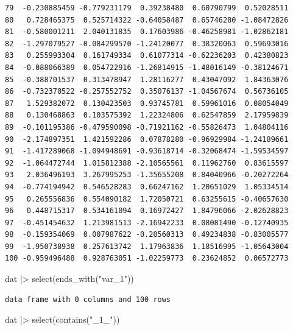 \documentclass[
  letterpaper,
  DIV=11,
  numbers=noendperiod]{scrreprt}
\newenvironment{Shaded}{\begin{snugshade}}{\end{snugshade}}
\newcommand{\FunctionTok}[1]{\textcolor[rgb]{0.28,0.35,0.67}{#1}}
\newcommand{\NormalTok}[1]{\textcolor[rgb]{0.00,0.23,0.31}{#1}}
\newcommand{\SpecialCharTok}[1]{\textcolor[rgb]{0.37,0.37,0.37}{#1}}
\newcommand{\StringTok}[1]{\textcolor[rgb]{0.13,0.47,0.30}{#1}}
\begin{document}
\begin{verbatim}
79  -0.230885459 -0.779231179  0.39238480  0.60790799  0.52028511
80   0.728465375  0.525714322 -0.64058487  0.65746280 -1.08472826
81  -0.580001211  2.040131835  0.17603986 -0.46258981 -1.02862181
82  -1.297079527 -0.084299570 -1.24120077  0.38320063  0.59693016
83   0.255993304  0.161749334  0.61077314 -0.62236203  0.42380823
84  -0.088066389  0.054722916 -1.26814915 -1.48016149 -0.38124671
85  -0.388701537  0.313478947  1.28116277  0.43047092  1.84363076
86  -0.732370522 -0.257552752  0.35076137 -1.04567674  0.56736105
87   1.529382072  0.130423503  0.93745781  0.59961016  0.08054049
88   0.130468863  0.103575392  1.22324806  0.62547859  2.17959839
89  -0.101195386 -0.479590098 -0.71921162 -0.55826473  1.04804116
90  -2.174897351  1.421592286  0.07878280 -0.96929984 -1.24189661
91  -1.417289068 -1.094948691 -0.93618714 -0.32068474 -1.59534597
92  -1.064472744  1.015812388 -2.10565561  0.11962760  0.83615597
93   2.036496193  3.267995253 -1.35655208  0.84040966 -0.20272264
94  -0.774194942  0.546528283  0.66247162  1.20651029  1.05334514
95   0.265556836  0.554090182  1.72050721  0.63255615 -0.40657630
96   0.448715317  0.534161094  0.16972427  1.84796066 -2.02628823
97  -0.451454632  1.213981513 -2.16942233  0.08081490 -0.12740935
98  -0.159354069  0.007987622 -0.20560313  0.49234838 -0.83005577
99  -1.950738938  0.257613742  1.17963836  1.18516995 -1.05643004
100 -0.959496488  0.928763051 -1.02259773  0.23624852  0.06572773
\end{verbatim}

\begin{Shaded}
\begin{Highlighting}[]
\NormalTok{dat }\SpecialCharTok{|\textgreater{}}
  \FunctionTok{select}\NormalTok{(}\FunctionTok{ends\_with}\NormalTok{(}\StringTok{"var\_1"}\NormalTok{)) }
\end{Highlighting}
\end{Shaded}

\begin{verbatim}
data frame with 0 columns and 100 rows
\end{verbatim}

\begin{Shaded}
\begin{Highlighting}[]
\NormalTok{dat }\SpecialCharTok{|\textgreater{}}
  \FunctionTok{select}\NormalTok{(}\FunctionTok{contains}\NormalTok{(}\StringTok{"\_1\_"}\NormalTok{)) }
\end{Highlighting}
\end{Shaded}
\end{document}
